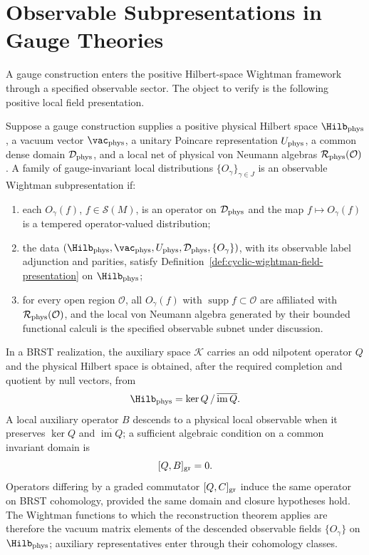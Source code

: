 \section{Observable Subpresentations in Gauge Theories}

A gauge construction enters the positive Hilbert-space Wightman framework
through a specified observable sector.  The object to verify is the following
positive local field presentation.

\begin{definition}
Suppose a gauge construction supplies a positive physical Hilbert space
\(\Hilb_{\rm phys}\), a vacuum vector \(\vac_{\rm phys}\), a unitary Poincare
representation \(U_{\rm phys}\), a common dense domain
\(\mathcal D_{\rm phys}\), and a local net of physical von Neumann algebras
\(\mathcal R_{\rm phys}(\mathcal O)\).  A family of gauge-invariant local
distributions \(\{O_\gamma\}_{\gamma\in J}\) is an observable Wightman
subpresentation if:
\begin{enumerate}[label=(\roman*)]
\item each \(O_\gamma(f)\), \(f\in\mathcal S(M)\), is an operator on
\(\mathcal D_{\rm phys}\) and the map \(f\mapsto O_\gamma(f)\) is a tempered
operator-valued distribution;
\item the data
\((\Hilb_{\rm phys},\vac_{\rm phys},U_{\rm phys},
\mathcal D_{\rm phys},\{O_\gamma\})\), with its observable label adjunction
and parities, satisfy Definition~\ref{def:cyclic-wightman-field-presentation}
on \(\Hilb_{\rm phys}\);
\item for every open region \(\mathcal O\), all \(O_\gamma(f)\) with
\(\operatorname{supp}f\subset\mathcal O\) are affiliated with
\(\mathcal R_{\rm phys}(\mathcal O)\), and the local von Neumann algebra
generated by their bounded functional calculi is the specified observable
subnet under discussion.
\end{enumerate}
\end{definition}

In a BRST realization, the auxiliary space \(\mathcal K\) carries an odd
nilpotent operator \(Q\) and the physical Hilbert space is obtained, after the
required completion and quotient by null vectors, from
\[
  \Hilb_{\rm phys}
  =
  \ker Q\,/\,\overline{\operatorname{im}Q}.
\]
A local auxiliary operator \(B\) descends to a physical local observable when it
preserves \(\ker Q\) and \(\overline{\operatorname{im}Q}\); a sufficient
algebraic condition on a common invariant domain is
\[
  [Q,B]_{\rm gr}=0.
\]
Operators differing by a graded commutator \([Q,C]_{\rm gr}\) induce the same
operator on BRST cohomology, provided the same domain and closure hypotheses
hold.  The Wightman functions to which the reconstruction theorem applies are
therefore the vacuum matrix elements of the descended observable fields
\(\{O_\gamma\}\) on \(\Hilb_{\rm phys}\); auxiliary representatives enter
through their cohomology classes.

